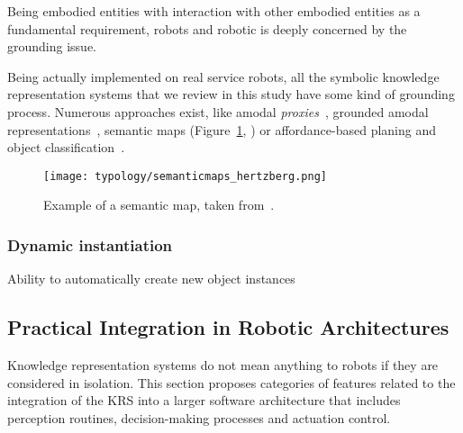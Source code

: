 Being embodied entities with interaction with other embodied entities as a
fundamental requirement, robots and robotic is deeply concerned by the
grounding issue.

Being actually implemented on real service robots, all the symbolic knowledge
representation systems that we review in this study have some kind of grounding
process. Numerous approaches exist, like amodal
\emph{proxies}~\cite{Jacobsson2008}, grounded amodal
representations~\cite{Alami2011, Mavridis2006}, semantic maps
(Figure~\ref{fig|semanticmap}, \cite{Nuechter2008, Galindo2008,Blodow2011}) or
affordance-based planing and object classification~\cite{Lorken2008,
Varadarajan2011}.

\begin{figure}
    \centering
    \texttt{[image: typology/semanticmaps\_hertzberg.png]}
    \caption{Example of a semantic map, taken from~\cite{Nuechter2008}.}
    \label{fig|semanticmap}
\end{figure}

\subsubsection{Dynamic instantiation}
\label{sect|new-instances}
Ability to automatically create new object instances

\subsection{Practical Integration in Robotic Architectures}
\label{sect|integration-robot}

\begin{scriptsize}
\begin{center}
\end{center}
\end{scriptsize}


Knowledge representation systems do not mean anything to robots if they are
considered in isolation. This section proposes categories of features related
to the integration of the KRS into a larger software architecture that includes
perception routines, decision-making processes and actuation control.

